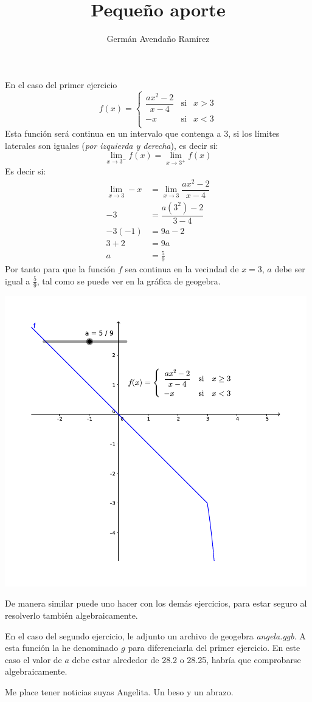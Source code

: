 \documentclass[11pt,letterpaper]{article}
\title{Pequeño aporte}
\author{Germán Avendaño Ramírez}
\begin{document}
\maketitle
En el caso del primer ejercicio
\[f(x)=\left\{ \begin{array}{lcl}
\dfrac{ax^{2}-2}{x-4} & \mbox{si} & x> 3\\
-x & \mbox{si} & x< 3\\
\end{array}
\right. \]
Esta función será continua en un intervalo que contenga a 3, si los límites laterales son iguales (\textit{por izquierda y derecha}),  es decir si:
\[\displaystyle{\lim_{x\rightarrow 3^{-}}f(x)=\lim_{x\rightarrow 3^{+}}f(x)}\]
Es decir si:
\begin{align*}
\displaystyle{\lim_{x\rightarrow 3}-x}&=\displaystyle{\lim_{x\rightarrow 3}\dfrac{ax^{2}-2}{x-4}}\\
-3&=\dfrac{a(3^{2})-2}{3-4}\\
-3(-1)&=9a-2\\
3+2&=9a\\
a&=\frac{5}{9}
\end{align*}
Por tanto para que la función $f$ sea continua en la vecindad de $x=3$, $a$ debe ser igual a  $\frac{5}{9}$, tal como se puede ver en la gráfica de geogebra.

\begin{center}
\includegraphics[scale=1.25]{Images/angela} 
\end{center}
De manera similar puede uno hacer con los demás ejercicios, para estar seguro al resolverlo también algebraicamente.

En el caso del segundo ejercicio, le adjunto un archivo de geogebra \textit{angela.ggb}. A esta función la he denominado $g$ para diferenciarla del primer ejercicio. En este caso el valor de $a$ debe estar alrededor de 28.2 o 28.25, habría que comprobarse algebraicamente.

Me place tener noticias suyas Angelita. Un beso y un abrazo.
\end{document}
